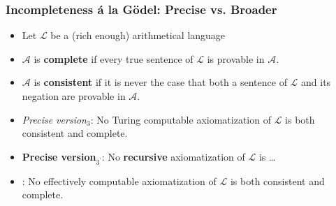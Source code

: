 \begin{frame}
\frametitle{Incompleteness \'a la G\"odel: Precise vs. Broader}

\begin{itemize}[<+->]

\item Let $\mathcal{L}$ be a (rich enough) arithmetical language

\item  $\mathcal{A}$ is \textbf{complete} if every true sentence of  $\mathcal{L}$ is provable in $\mathcal{A}$.

\item  $\mathcal{A}$ is \textbf{consistent} if it is never the case that both a sentence of  $\mathcal{L}$ and its negation are provable in  $\mathcal{A}$.


\item \emph{Precise version$_3$}: No \textcolor{highlightA}{Turing computable} axiomatization of $\mathcal{L}$ is both consistent and complete.

\item \textbf{Precise version$_{3^{'}}$}: No \textbf{recursive} axiomatization of $\mathcal{L}$ is \dots %

\item {}: No \textcolor{OGlyallpink}{effectively computable} axiomatization of $\mathcal{L}$ is both consistent and complete. 

\end{itemize}
\end{frame}



